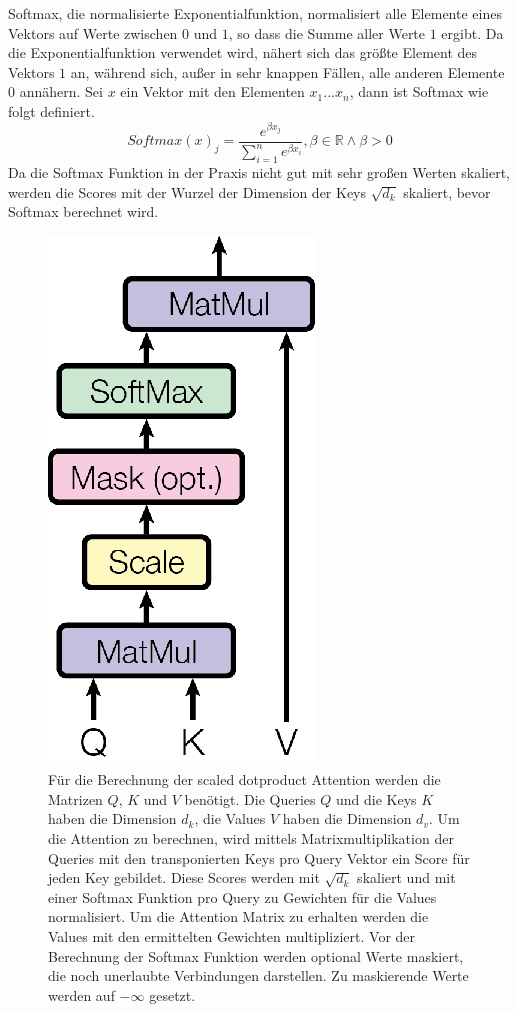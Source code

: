 \documentclass[conference]{IEEEtran}
\begin{document}
Softmax, die normalisierte Exponentialfunktion, normalisiert alle Elemente eines Vektors auf Werte zwischen $0$ und $1$, so dass die Summe aller Werte $1$ ergibt. Da die Exponentialfunktion verwendet wird, nähert sich das größte Element des Vektors $1$ an, während sich, außer in sehr knappen Fällen, alle anderen Elemente $0$ annähern. Sei $x$ ein Vektor mit den Elementen $x_1 ... x_n$, dann ist Softmax wie folgt definiert. \cite{softmax_to_softassign}
\begin{equation} \label{eq:softmax}
    Softmax(x)_j = \frac{e^{\beta x_j}}{\sum_{i = 1}^{n} e^{\beta x_i}}, \beta \in \mathbb{R} \land \beta > 0
\end{equation}
Da die Softmax Funktion in der Praxis nicht gut mit sehr großen Werten skaliert, werden die Scores mit der Wurzel der Dimension der Keys $\sqrt{d_k}$ skaliert, bevor Softmax berechnet wird. \cite{attention_is_all_you_need}

\begin{figure}[htbp]
\centerline{\includegraphics{img/scaled_dotproduct_attention.png}}
\caption{Für die Berechnung der scaled dotproduct Attention werden die Matrizen $Q$, $K$ und $V$ benötigt. Die Queries $Q$ und die Keys $K$ haben die Dimension $d_k$, die Values $V$ haben die Dimension $d_v$. Um die Attention zu berechnen, wird mittels Matrixmultiplikation der Queries mit den transponierten Keys pro Query Vektor ein Score für jeden Key gebildet. Diese Scores werden mit $\sqrt{d_k}$ skaliert und mit einer Softmax Funktion pro Query zu Gewichten für die Values normalisiert. Um die Attention Matrix zu erhalten werden die Values mit den ermittelten Gewichten multipliziert. Vor der Berechnung der Softmax Funktion werden optional Werte maskiert, die noch unerlaubte Verbindungen darstellen. Zu maskierende Werte werden auf $-\infty$ gesetzt. \cite{attention_is_all_you_need}}
\label{fig:2}
\end{figure}
\end{document}
